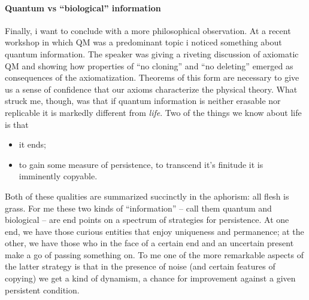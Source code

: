 \paragraph{Quantum vs ``biological'' information}
Finally, i want to conclude with a more philosophical observation. At
a recent workshop in which QM was a predominant topic i noticed
something about quantum information. The speaker was giving a riveting
discussion of axiomatic QM and showing how properties of ``no
cloning'' and ``no deleting'' emerged as consequences of the
axiomatization. Theorems of this form are necessary to give us a sense
of confidence that our axioms characterize the physical theory. What
struck me, though, was that if quantum information is neither erasable
nor replicable it is markedly different from \emph{life}. Two of the
things we know about life is that

\begin{itemize}
  \item it ends;
  \item to gain some measure of persistence, to transcend it's
    finitude it is imminently copyable.
\end{itemize}

Both of these qualities are summarized succinctly in the aphorism: all
flesh is grass. For me these two kinds of ``information'' -- call them
quantum and biological -- are end points on a spectrum of strategies
for persistence. At one end, we have those curious entities that enjoy
uniqueness and permanence; at the other, we have those who in the face
of a certain end and an uncertain present make a go of passing
something on. To me one of the more remarkable aspects of the latter
strategy is that in the presence of noise (and certain features of
copying) we get a kind of dynamism, a chance for improvement against a
given persistent condition.



